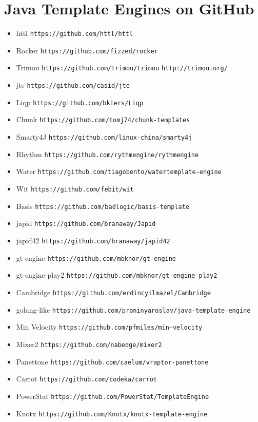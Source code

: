 \chapter{Java Template Engines on GitHub}
\label{appendix:engines}

\begin{singlespace}
\begin{itemize}
\item httl \verb!https://github.com/httl/httl!
\item Rocker \verb!https://github.com/fizzed/rocker!
\item Trimou \verb!https://github.com/trimou/trimou! \verb!http://trimou.org/!
\item jte \verb!https://github.com/casid/jte!
\item Liqp \verb!https://github.com/bkiers/Liqp!
\item Chunk \verb!https://github.com/tomj74/chunk-templates!
\item Smarty4J \verb!https://github.com/linux-china/smarty4j!
\item Rhythm \verb!https://github.com/rythmengine/rythmengine!
\item Water \verb!https://github.com/tiagobento/watertemplate-engine!
\item Wit \verb!https://github.com/febit/wit!
\item Basis \verb!https://github.com/badlogic/basis-template!
\item japid \verb!https://github.com/branaway/Japid!
\item japid42 \verb!https://github.com/branaway/japid42!
\item gt-engine \verb!https://github.com/mbknor/gt-engine!
\item gt-engine-play2 \verb!https://github.com/mbknor/gt-engine-play2!
\item Cambridge \verb!https://github.com/erdincyilmazel/Cambridge!
\item golang-like \verb!https://github.com/proninyaroslav/java-template-engine!
\item Min Velocity \verb!https://github.com/pfmiles/min-velocity!
\item Mixer2 \verb!https://github.com/nabedge/mixer2!
\item Panettone \verb!https://github.com/caelum/vraptor-panettone!
\item Carrot \verb!https://github.com/codeka/carrot!
\item PowerStat \verb!https://github.com/PowerStat/TemplateEngine!
\item Knotx \verb!https://github.com/Knotx/knotx-template-engine!

\end{itemize}
\end{singlespace}
